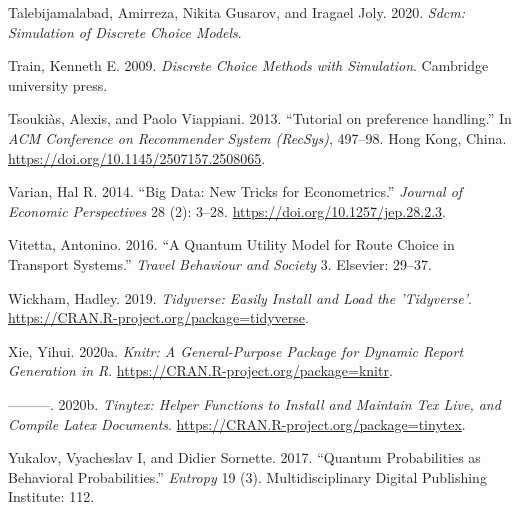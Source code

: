 \documentclass[12pt,]{article}
\begin{document}
\leavevmode\hypertarget{ref-R-sdcm}{}%
Talebijamalabad, Amirreza, Nikita Gusarov, and Iragael Joly. 2020.
\emph{Sdcm: Simulation of Discrete Choice Models}.

\leavevmode\hypertarget{ref-train2009dc}{}%
Train, Kenneth E. 2009. \emph{Discrete Choice Methods with Simulation}.
Cambridge university press.

\leavevmode\hypertarget{ref-tsoukias2013ph}{}%
Tsoukiàs, Alexis, and Paolo Viappiani. 2013. ``Tutorial on preference
handling.'' In \emph{ACM Conference on Recommender System (RecSys)},
497--98. Hong Kong, China.
\url{https://doi.org/10.1145/2507157.2508065}.

\leavevmode\hypertarget{ref-varian2014bd}{}%
Varian, Hal R. 2014. ``Big Data: New Tricks for Econometrics.''
\emph{Journal of Economic Perspectives} 28 (2): 3--28.
\url{https://doi.org/10.1257/jep.28.2.3}.

\leavevmode\hypertarget{ref-vitetta2016quantum}{}%
Vitetta, Antonino. 2016. ``A Quantum Utility Model for Route Choice in
Transport Systems.'' \emph{Travel Behaviour and Society} 3. Elsevier:
29--37.

\leavevmode\hypertarget{ref-R-tidyverse}{}%
Wickham, Hadley. 2019. \emph{Tidyverse: Easily Install and Load the
'Tidyverse'}. \url{https://CRAN.R-project.org/package=tidyverse}.

\leavevmode\hypertarget{ref-R-knitr}{}%
Xie, Yihui. 2020a. \emph{Knitr: A General-Purpose Package for Dynamic
Report Generation in R}. \url{https://CRAN.R-project.org/package=knitr}.

\leavevmode\hypertarget{ref-R-tinytex}{}%
---------. 2020b. \emph{Tinytex: Helper Functions to Install and
Maintain Tex Live, and Compile Latex Documents}.
\url{https://CRAN.R-project.org/package=tinytex}.

\leavevmode\hypertarget{ref-yukalov2017quantum}{}%
Yukalov, Vyacheslav I, and Didier Sornette. 2017. ``Quantum
Probabilities as Behavioral Probabilities.'' \emph{Entropy} 19 (3).
Multidisciplinary Digital Publishing Institute: 112.
\end{document}
